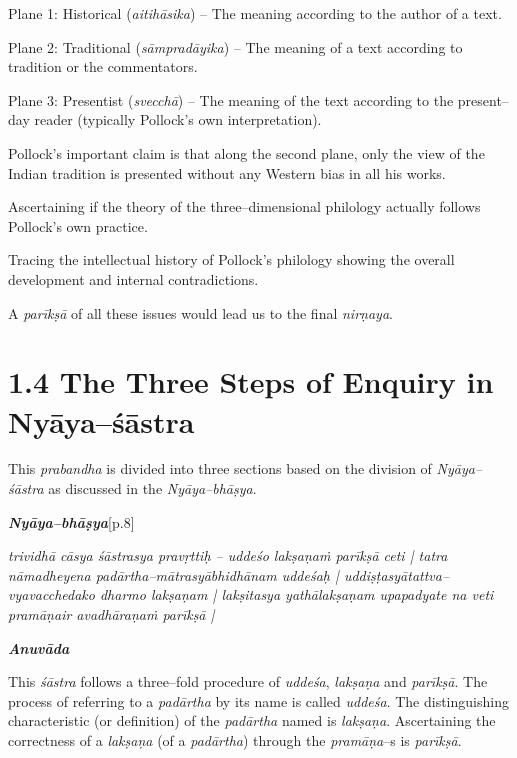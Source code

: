  \item Plane 1: Historical (\textit{aitihāsika}) – The meaning according to the author of a text.

 \item Plane 2: Traditional (\textit{sāmpradāyika}) – The meaning of a text according to tradition or the commentators.

 \item Plane 3: Presentist (\textit{svecchā}) – The meaning of the text according to the present–day reader (typically Pollock’s own interpretation).

Pollock’s important claim is that along the second plane, only the view of the Indian tradition is presented without any Western bias in all his works.

 \item Ascertaining if the theory of the three–dimensional philology actually follows Pollock’s own practice.

 \item Tracing the intellectual history of Pollock’s philology showing the overall development and internal contradictions.

A \textit{parīkṣā} of all these issues would lead us to the final \textit{nirṇaya}.


\section*{1.4 The Three Steps of Enquiry in Nyāya–śāstra}

This \textit{prabandha} is divided into three sections based on the division of \textit{Nyāya–śāstra} as discussed in the \textit{Nyāya–bhāṣya}.

\textit{\textbf{Nyāya–bhāṣya}}[p.8]

\begin{myquote}
\textit{trividhā cāsya śāstrasya pravṛttiḥ – uddeśo lakṣaṇaṁ parīkṣā ceti | tatra nāmadheyena padārtha–mātrasyābhidhānam uddeśaḥ | uddiṣṭasyātattva–vyavacchedako dharmo lakṣaṇam | lakṣitasya yathālakṣaṇam upapadyate na veti pramāṇair avadhāraṇaṁ parīkṣā |}
\end{myquote}

\textit{\textbf{Anuvāda}}

This \textit{śāstra} follows a three–fold procedure of \textit{uddeśa}, \textit{lakṣaṇa} and \textit{parīkṣā}. The process of referring to a \textit{padārtha} by its name is called \textit{uddeśa}. The distinguishing characteristic (or definition) of the \textit{padārtha} named is\textit{ lakṣaṇa}. Ascertaining the correctness of a \textit{lakṣaṇa} (of a \textit{padārtha}) through the \textit{pramāṇa}–s is \textit{parīkṣā}.

